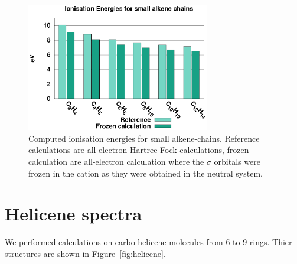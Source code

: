 \documentclass[aip]{revtex4-1}
\begin{document}
\begin{figure}
\begin{center}
\includegraphics[width=8cm]{froz_comp}
\end{center}
\caption{Computed ionisation energies for small alkene-chains. Reference calculations are all-electron Hartree-Fock calculations, frozen calculation 
are all-electron calculation where the $\sigma$ orbitals were frozen in the cation as they were obtained in the neutral system.}
\label{fig:froz_comp}
\end{figure}

%

\section*{Helicene spectra}
We performed calculations on carbo-helicene molecules from 6 to 9 rings. Thier structures are
shown in Figure~\ref{fig:helicene}.
\end{document}
